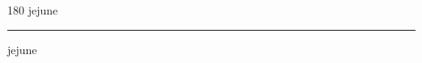 
\begin{frame}
\begin{center}
\begin{turn}{180}
{\fontsize{2.5cm}{1em}\selectfont jejune}
\end{turn}
\vspace{1em}\par  
\hrule
\vspace{1em}\par  
{\fontsize{2.5cm}{1em}\selectfont jejune}
\end{center}
\end{frame}

